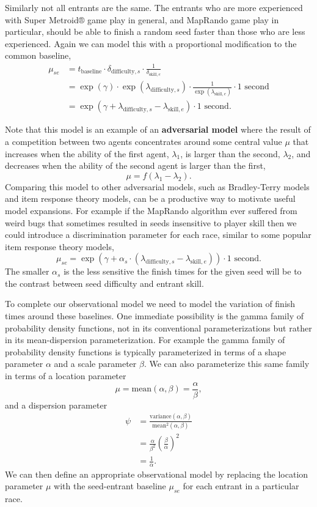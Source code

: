 \documentclass[
  letterpaper,
  DIV=11,
  numbers=noendperiod]{scrartcl}
\begin{document}
Similarly not all entrants are the same. The entrants who are more
experienced with Super Metroid® game play in general, and MapRando game
play in particular, should be able to finish a random seed faster than
those who are less experienced. Again we can model this with a
proportional modification to the common baseline, \begin{align*}
\mu_{se}
&=
t_{\mathrm{baseline}}
\cdot \delta_{\mathrm{difficulty}, s}
\cdot \frac{1}{\delta_{\mathrm{skill}, e}}
\\
&=
\exp(\gamma)
\cdot \exp( \lambda_{\mathrm{difficulty}, s} )
\cdot \frac{1}{\exp( \lambda_{\mathrm{skill}, e} ) }
\cdot 1 \text{ second}
\\
&=
\exp(\gamma + \lambda_{\mathrm{difficulty}, s} - \lambda_{\mathrm{skill}, e})
\cdot 1 \text{ second}.
\end{align*}

Note that this model is an example of an \textbf{adversarial model}
where the result of a competition between two agents concentrates around
some central value \(\mu\) that increases when the ability of the first
agent, \(\lambda_{1}\), is larger than the second, \(\lambda_{2}\), and
decreases when the ability of the second agent is larger than the first,
\[
\mu = f( \lambda_{1} - \lambda_{2} ).
\] Comparing this model to other adversarial models, such as
Bradley-Terry models and item response theory models, can be a
productive way to motivate useful model expansions. For example if the
MapRando algorithm ever suffered from weird bugs that sometimes resulted
in seeds insensitive to player skill then we could introduce a
discrimination parameter for each race, similar to some popular item
response theory models, \[
\mu_{se}
=
\exp(
\gamma
+ \alpha_{s} \cdot (  \lambda_{\mathrm{difficulty}, s}
                    - \lambda_{\mathrm{skill}, e}) )
\cdot 1 \text{ second}.
\] The smaller \(\alpha_{s}\) is the less sensitive the finish times for
the given seed will be to the contrast between seed difficulty and
entrant skill.

To complete our observational model we need to model the variation of
finish times around these baselines. One immediate possibility is the
gamma family of probability density functions, not in its conventional
parameterizations but rather in its mean-dispersion parameterization.
For example the gamma family of probability density functions is
typically parameterized in terms of a shape parameter \(\alpha\) and a
scale parameter \(\beta\). We can also parameterize this same family in
terms of a location parameter \[
\mu = \text{mean}(\alpha, \beta) = \frac{\alpha}{\beta},
\] and a dispersion parameter \begin{align*}
\psi
&=
\frac{ \text{variance}(\alpha, \beta) }{ \text{mean}^{2}(\alpha, \beta) }
\\
&=
\frac{\alpha}{\beta^{2}} \left( \frac{\beta}{\alpha} \right)^{2}
\\
&=
\frac{1}{\alpha}.
\end{align*} We can then define an appropriate observational model by
replacing the location parameter \(\mu\) with the seed-entrant baseline
\(\mu_{se}\) for each entrant in a particular race.
\end{document}
